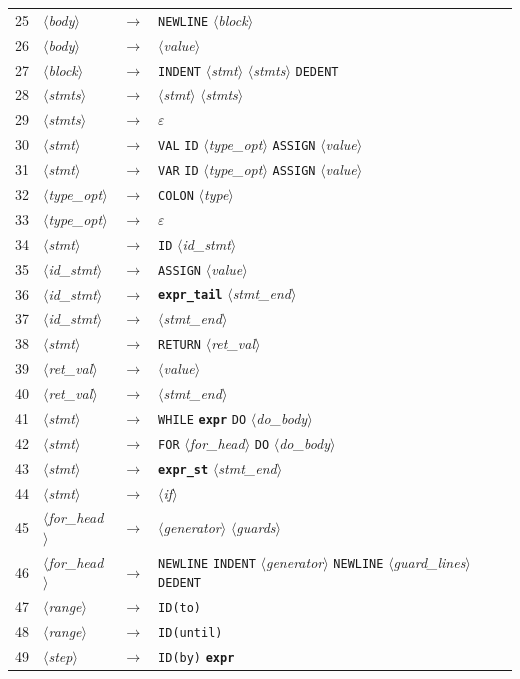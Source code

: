 \documentclass[a4paper,11pt]{article}
\newcommand{\nt}[1]{$\langle$\textit{#1}$\rangle$}   %
\newcommand{\tk}[1]{\texttt{#1}}                     %
\newcommand{\pt}[1]{\texttt{\textbf{#1}}}            %
\begin{document}
\begin{longtable}{r l c l}
25 & \nt{body} & $\rightarrow$ & \tk{NEWLINE} \nt{block} \\
26 & \nt{body} & $\rightarrow$ & \nt{value} \\
27 & \nt{block} & $\rightarrow$ & \tk{INDENT} \nt{stmt} \nt{stmts} \tk{DEDENT} \\
28 & \nt{stmts} & $\rightarrow$ & \nt{stmt} \nt{stmts} \\
29 & \nt{stmts} & $\rightarrow$ & $\varepsilon$ \\
30 & \nt{stmt} & $\rightarrow$ & \tk{VAL} \tk{ID} \nt{type\_opt} \tk{ASSIGN} \nt{value} \\
31 & \nt{stmt} & $\rightarrow$ & \tk{VAR} \tk{ID} \nt{type\_opt} \tk{ASSIGN} \nt{value} \\
32 & \nt{type\_opt} & $\rightarrow$ & \tk{COLON} \nt{type} \\
33 & \nt{type\_opt} & $\rightarrow$ & $\varepsilon$ \\
34 & \nt{stmt} & $\rightarrow$ & \tk{ID} \nt{id\_stmt} \\
35 & \nt{id\_stmt} & $\rightarrow$ & \tk{ASSIGN} \nt{value} \\
36 & \nt{id\_stmt} & $\rightarrow$ & \pt{expr\_tail} \nt{stmt\_end} \\
37 & \nt{id\_stmt} & $\rightarrow$ & \nt{stmt\_end} \\
38 & \nt{stmt} & $\rightarrow$ & \tk{RETURN} \nt{ret\_val} \\
39 & \nt{ret\_val} & $\rightarrow$ & \nt{value} \\
40 & \nt{ret\_val} & $\rightarrow$ & \nt{stmt\_end} \\
41 & \nt{stmt} & $\rightarrow$ & \tk{WHILE} \pt{expr} \tk{DO} \nt{do\_body} \\
42 & \nt{stmt} & $\rightarrow$ & \tk{FOR} \nt{for\_head} \tk{DO} \nt{do\_body} \\
43 & \nt{stmt} & $\rightarrow$ & \pt{expr\_st} \nt{stmt\_end} \\
44 & \nt{stmt} & $\rightarrow$ & \nt{if} \\
45 & \nt{for\_head} & $\rightarrow$ & \nt{generator} \nt{guards} \\
46 & \nt{for\_head} & $\rightarrow$ & \tk{NEWLINE} \tk{INDENT} \nt{generator} \tk{NEWLINE} \nt{guard\_lines} \tk{DEDENT} \\
47 & \nt{range} & $\rightarrow$ & \tk{ID(to)} \\
48 & \nt{range} & $\rightarrow$ & \tk{ID(until)} \\
49 & \nt{step} & $\rightarrow$ & \tk{ID(by)} \pt{expr} \\

\end{longtable}
\end{document}
